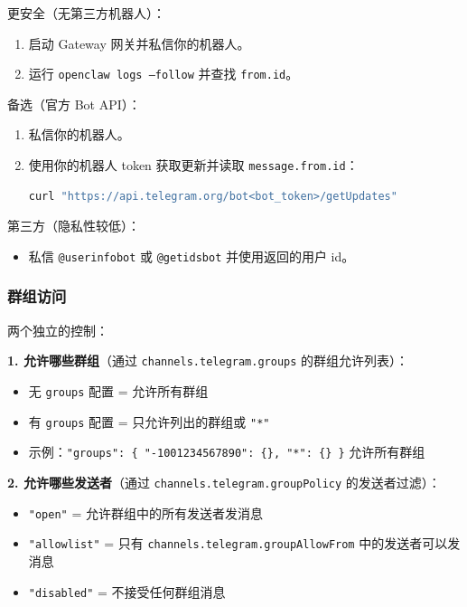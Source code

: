 更安全（无第三方机器人）：

\begin{enumerate}
  \item 启动 Gateway 网关并私信你的机器人。
  \item 运行 \texttt{openclaw logs --follow} 并查找 \texttt{from.id}。
\end{enumerate}


备选（官方 Bot API）：

\begin{enumerate}
  \item 私信你的机器人。
  \item 使用你的机器人 token 获取更新并读取 \texttt{message.from.id}：
\begin{lstlisting}[language=bash]
   curl "https://api.telegram.org/bot<bot_token>/getUpdates"
\end{lstlisting}

\end{enumerate}


第三方（隐私性较低）：

\begin{itemize}
  \item 私信 \texttt{@userinfobot} 或 \texttt{@getidsbot} 并使用返回的用户 id。
\end{itemize}


\subsubsection{群组访问}


两个独立的控制：

\textbf{1. 允许哪些群组}（通过 \texttt{channels.telegram.groups} 的群组允许列表）：

\begin{itemize}
  \item 无 \texttt{groups} 配置 = 允许所有群组
  \item 有 \texttt{groups} 配置 = 只允许列出的群组或 \texttt{"*"}
  \item 示例：\texttt{"groups": \{ "-1001234567890": \{\}, "*": \{\} \}} 允许所有群组
\end{itemize}


\textbf{2. 允许哪些发送者}（通过 \texttt{channels.telegram.groupPolicy} 的发送者过滤）：

\begin{itemize}
  \item \texttt{"open"} = 允许群组中的所有发送者发消息
  \item \texttt{"allowlist"} = 只有 \texttt{channels.telegram.groupAllowFrom} 中的发送者可以发消息
  \item \texttt{"disabled"} = 不接受任何群组消息
\end{itemize}

